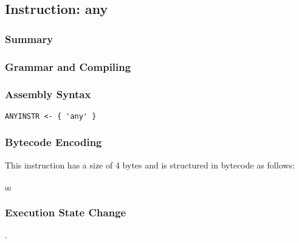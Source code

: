 \subsection{Instruction: any}

\subsubsection{Summary}


\subsubsection{Grammar and Compiling}


\subsubsection{Assembly Syntax}

\begin{myquote}
\begin{verbatim}
ANYINSTR <- { 'any' }
\end{verbatim}
\end{myquote}

\subsubsection{Bytecode Encoding}

This instruction has a size of 4 bytes and is structured in bytecode as follows:

$_{00}$\ 


\subsubsection{Execution State Change}

.


